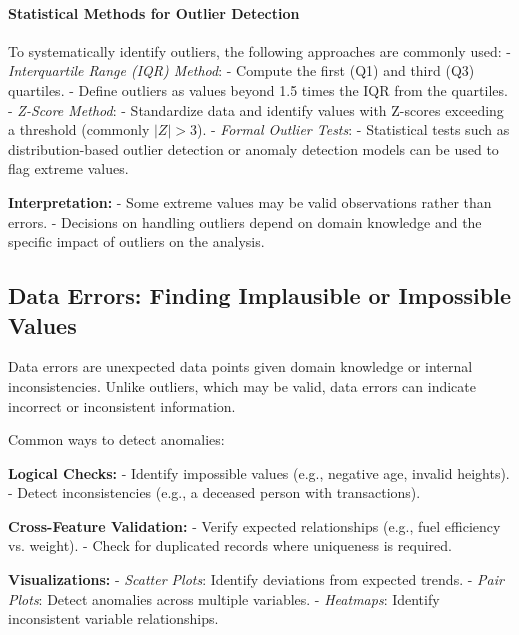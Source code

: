 \documentclass[12pt,openany]{book}
\begin{document}
\paragraph{Statistical Methods for Outlier Detection}
To systematically identify outliers, the following approaches are commonly used:
\newline
- \textit{Interquartile Range (IQR) Method}:  
  - Compute the first (Q1) and third (Q3) quartiles.  
  - Define outliers as values beyond 1.5 times the IQR from the quartiles.  
\newline
- \textit{Z-Score Method}:  
  - Standardize data and identify values with Z-scores exceeding a threshold 
    (commonly \( |Z| > 3 \)).  
\newline
- \textit{Formal Outlier Tests}:  
  - Statistical tests such as distribution-based outlier detection or 
    anomaly detection models can be used to flag extreme values.
\newline

\textbf{Interpretation:}  
\newline
- Some extreme values may be valid observations rather than errors.  
- Decisions on handling outliers depend on domain knowledge and the specific 
  impact of outliers on the analysis.  
\newline


\subsection{Data Errors: Finding Implausible or Impossible Values}

Data errors are unexpected data points given domain knowledge or internal inconsistencies. Unlike outliers, which may be valid, data errors can indicate incorrect or inconsistent information.
\newline

Common ways to detect anomalies:
\newline

\textbf{Logical Checks:}
- Identify impossible values (e.g., negative age, invalid heights).
- Detect inconsistencies (e.g., a deceased person with transactions).
\newline

\textbf{Cross-Feature Validation:}
- Verify expected relationships (e.g., fuel efficiency vs. weight).
- Check for duplicated records where uniqueness is required.
\newline

\textbf{Visualizations:}
- \textit{Scatter Plots}: Identify deviations from expected trends.
- \textit{Pair Plots}: Detect anomalies across multiple variables.
- \textit{Heatmaps}: Identify inconsistent variable relationships.
\newline
\end{document}
